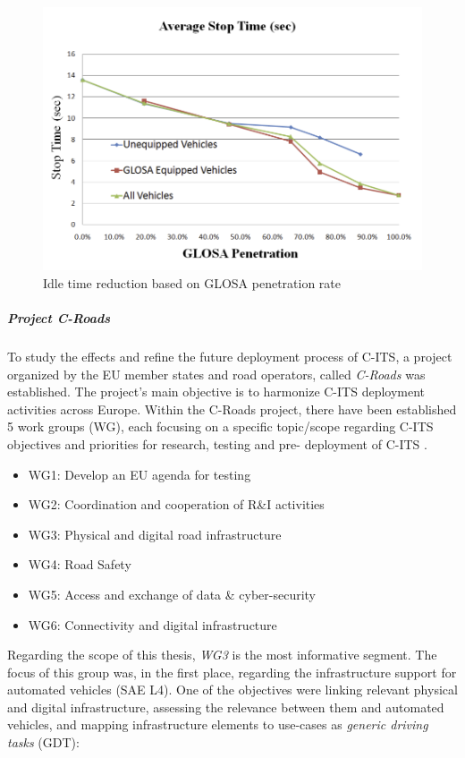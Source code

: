 \documentclass[main.tex]{subfiles}
\begin{document}
\begin{figure}[htbp]
    \centering
    \includegraphics[width=.8\textwidth]{glosa-perf-chart.png} 
    \caption{Idle time reduction based on GLOSA penetration rate \cite{Katsaros_2011}}
    \label{glosa-chart}
\end{figure}

\subparagraph{Project C-Roads}\label{sec-croads}

To study the effects and refine the future deployment process of C-ITS, a project 
organized by the EU member states and road operators, called \emph{C-Roads} was established. 
The project's main objective is to harmonize C-ITS deployment activities across Europe. 
Within the C-Roads project, there have been established 5 work groups (WG), each focusing on a 
specific topic/scope regarding C-ITS objectives and priorities for research, testing and pre-
deployment of C-ITS \cite{Commision2021}. 

\begin{itemize}
    \item WG1: Develop an EU agenda for testing
    \item WG2: Coordination and cooperation of R\&I activities
    \item WG3: Physical and digital road infrastructure
    \item WG4: Road Safety
    \item WG5: Access and exchange of data \& cyber-security
    \item WG6: Connectivity and digital infrastructure
\end{itemize}

Regarding the scope of this thesis, \emph{WG3} is the most informative segment. The focus of this group 
was, in the first place, regarding the infrastructure support for automated vehicles (SAE L4). One of 
the objectives were linking relevant physical and digital infrastructure, assessing the relevance between 
them and automated vehicles, and mapping infrastructure elements to use-cases as \emph{generic driving 
tasks} (GDT):
\end{document}
